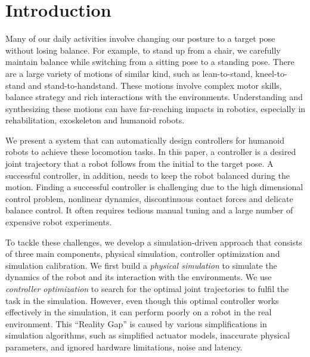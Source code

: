 \section{Introduction}

Many of our daily activities involve changing our posture to a target pose without losing balance. For example, to stand up from a chair, we carefully maintain balance while switching from a sitting pose to a standing pose. There are a large variety of motions of similar kind, such as lean-to-stand, kneel-to-stand and stand-to-handstand. These motions involve complex motor skills, balance strategy and rich interactions with the environments. Understanding and synthesizing these motions can have far-reaching impacts in robotics, especially in rehabilitation, exoskeleton and humanoid robots.


We present a system that can automatically design controllers for humanoid robots to achieve these locomotion tasks. In this paper, a controller is a desired joint trajectory that a robot follows from the initial to the target pose. A successful controller, in addition, needs to keep the robot balanced during the motion. Finding a successful controller is challenging due to the high dimensional control problem, nonlinear dynamics, discontinuous contact forces and delicate balance control. It often requires tedious manual tuning and a large number of expensive robot experiments. 

To tackle these challenges, we develop a simulation-driven approach that consists of three main components, physical simulation, controller optimization and simulation calibration. We first build a \emph{physical simulation} to simulate the dynamics of the robot and its interaction with the environments. We use \emph{controller optimization} to search for the optimal joint trajectories to fulfil the task in the simulation. However, even though this optimal controller works effectively in the simulation, it can perform poorly on a robot in the real environment. This ``Reality Gap'' \cite{Jakobi95} is caused by various simplifications in simulation algorithms, such as simplified actuator models, inaccurate physical parameters, and ignored hardware limitations, noise and latency. 

